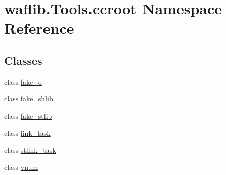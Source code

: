 \hypertarget{namespacewaflib_1_1_tools_1_1ccroot}{}\section{waflib.\+Tools.\+ccroot Namespace Reference}
\label{namespacewaflib_1_1_tools_1_1ccroot}
\subsection*{Classes}
\begin{DoxyCompactItemize}
\item 
class \hyperlink{classwaflib_1_1_tools_1_1ccroot_1_1fake__o}{fake\+\_\+o}
\item 
class \hyperlink{classwaflib_1_1_tools_1_1ccroot_1_1fake__shlib}{fake\+\_\+shlib}
\item 
class \hyperlink{classwaflib_1_1_tools_1_1ccroot_1_1fake__stlib}{fake\+\_\+stlib}
\item 
class \hyperlink{classwaflib_1_1_tools_1_1ccroot_1_1link__task}{link\+\_\+task}
\item 
class \hyperlink{classwaflib_1_1_tools_1_1ccroot_1_1stlink__task}{stlink\+\_\+task}
\item 
class \hyperlink{classwaflib_1_1_tools_1_1ccroot_1_1vnum}{vnum}
\end{DoxyCompactItemize}
